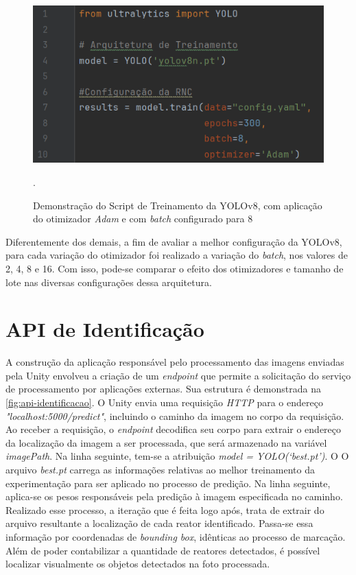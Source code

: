 \begin{figure}[!h]
    \centering
    \begin{minipage}{0.7\linewidth}
    \centering
    \captionsetup{justification=centering,margin=0.5cm,font=small}
    \includegraphics[width=1\linewidth]{img/cap5/yolov8-adam.png}
    \caption{Demonstração do Script de Treinamento da YOLOv8, com aplicação do otimizador \textit{Adam} e com \textit{batch} configurado para 8}.
    \label{fig:script-yolov8}
    \end{minipage}
\end{figure}

Diferentemente dos demais, a fim de avaliar a melhor configuração da YOLOv8, para cada variação do otimizador foi realizado a variação do \textit{batch}, nos valores de 2, 4, 8 e 16. Com isso, pode-se comparar o efeito dos otimizadores e tamanho de lote nas diversas configurações dessa arquitetura.

\section{API de Identificação}

A construção da aplicação responsável pelo processamento das imagens enviadas pela Unity envolveu a criação de um \textit{endpoint} que permite a solicitação do serviço de processamento por aplicações externas. Sua estrutura é demonstrada na \ref{fig:api-identificacao}. O Unity envia uma requisição \textit{HTTP} para o endereço \textit{"localhost:5000/predict"}, incluindo o caminho da imagem no corpo da requisição. Ao receber a requisição, o \textit{endpoint} decodifica seu corpo para extrair o endereço da localização da imagem a ser processada, que será armazenado na variável \textit{imagePath}. Na linha seguinte, tem-se a atribuição \textit{model = YOLO(‘best.pt’)}. O O arquivo \textit{best.pt} carrega as informações relativas ao melhor treinamento da experimentação para ser aplicado no processo de predição. Na linha seguinte, aplica-se os pesos responsáveis pela predição à imagem especificada no caminho. Realizado esse processo, a iteração que é feita logo após, trata de extrair do arquivo resultante a localização de cada reator identificado. Passa-se essa informação por coordenadas de \textit{bounding box}, idênticas ao processo de marcação. Além de poder contabilizar a quantidade de reatores detectados, é possível localizar visualmente os objetos detectados na foto processada.

